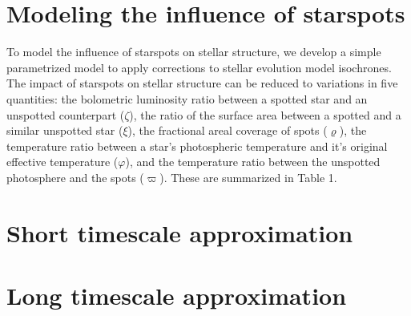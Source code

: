 \section{Modeling the influence of starspots}

To model the influence of starspots on stellar structure, we develop a simple parametrized model to apply corrections to stellar evolution model isochrones. The impact of starspots on stellar structure can be reduced to variations in five quantities: the bolometric luminosity ratio between a spotted star and an unspotted counterpart (\(\zeta\)), the ratio of the surface area between a spotted and a similar unspotted star (\(\xi\)), the fractional areal coverage of spots (\(\varrho\)), the temperature ratio between a star’s photospheric temperature and it's original effective temperature (\(\varphi\)), and the temperature ratio between the unspotted photosphere and the spots (\(\varpi\)). These are summarized in Table 1.

\section{Short timescale approximation}

\section{Long timescale approximation}